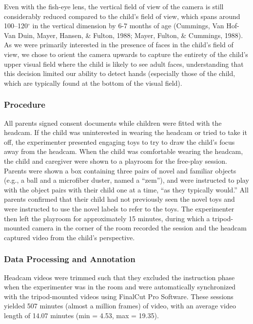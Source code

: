 \documentclass[english,man]{apa6}
\begin{document}
Even with the fish-eye lens, the vertical field of view of the camera is
still considerably reduced compared to the child's field of view, which
spans around 100--120\(^{\circ}\) in the vertical dimension by 6-7
months of age (Cummings, Van Hof-Van Duin, Mayer, Hansen, \& Fulton,
1988; Mayer, Fulton, \& Cummings, 1988). As we were primarily interested
in the presence of faces in the child's field of view, we chose to
orient the camera upwards to capture the entirety of the child's upper
visual field where the child is likely to see adult faces, understanding
that this decision limited our ability to detect hands (especially those
of the child, which are typically found at the bottom of the visual
field).

\subsubsection{Procedure}\label{procedure}

All parents signed consent documents while children were fitted with the
headcam. If the child was uninterested in wearing the headcam or tried
to take it off, the experimenter presented engaging toys to try to draw
the child's focus away from the headcam. When the child was comfortable
wearing the headcam, the child and caregiver were shown to a playroom
for the free-play session. Parents were shown a box containing three
pairs of novel and familiar objects (e.g., a ball and a microfiber
duster, named a \enquote{zem}), and were instructed to play with the
object pairs with their child one at a time, \enquote{as they typically
would.} All parents confirmed that their child had not previously seen
the novel toys and were instructed to use the novel labels to refer to
the toys. The experimenter then left the playroom for approximately 15
minutes, during which a tripod-mounted camera in the corner of the room
recorded the session and the headcam captured video from the child's
perspective.

\subsubsection{Data Processing and
Annotation}\label{data-processing-and-annotation}

Headcam videos were trimmed such that they excluded the instruction
phase when the experimenter was in the room and were automatically
synchronized with the tripod-mounted videos using FinalCut Pro Software.
These sessions yielded 507 minutes (almost a million frames) of video,
with an average video length of 14.07 minutes (min = 4.53, max = 19.35).
\end{document}

